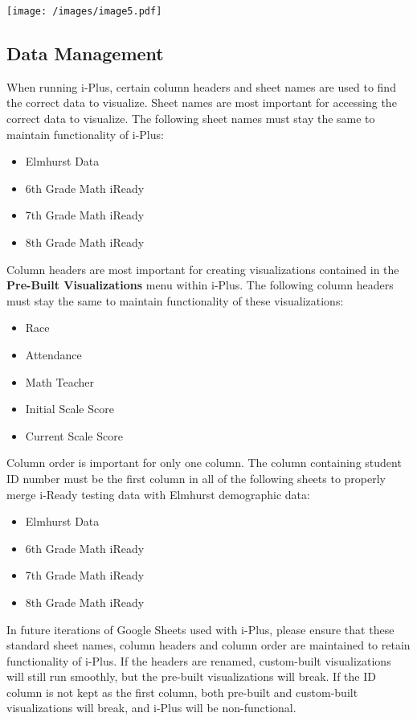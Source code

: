 \documentclass[
  letterpaper,
  DIV=11,
  numbers=noendperiod]{scrartcl}
\providecommand{\tightlist}{%
  \setlength{\itemsep}{0pt}\setlength{\parskip}{0pt}}\usepackage{longtable,booktabs,array}
\begin{document}
\texttt{[image: /images/image5.pdf]}

\subsection{Data Management}\label{data-management}

When running i-Plus, certain column headers and sheet names are used to
find the correct data to visualize. Sheet names are most important for
accessing the correct data to visualize. The following sheet names must
stay the same to maintain functionality of i-Plus:

\begin{itemize}
\tightlist
\item
  Elmhurst Data
\item
  6th Grade Math iReady
\item
  7th Grade Math iReady
\item
  8th Grade Math iReady
\end{itemize}

Column headers are most important for creating visualizations contained
in the \textbf{Pre-Built Visualizations} menu within i-Plus. The
following column headers must stay the same to maintain functionality of
these visualizations:

\begin{itemize}
\tightlist
\item
  Race
\item
  Attendance
\item
  Math Teacher
\item
  Initial Scale Score
\item
  Current Scale Score
\end{itemize}

Column order is important for only one column. The column containing
student ID number must be the first column in all of the following
sheets to properly merge i-Ready testing data with Elmhurst demographic
data:

\begin{itemize}
\tightlist
\item
  Elmhurst Data
\item
  6th Grade Math iReady
\item
  7th Grade Math iReady
\item
  8th Grade Math iReady
\end{itemize}

In future iterations of Google Sheets used with i-Plus, please ensure
that these standard sheet names, column headers and column order are
maintained to retain functionality of i-Plus. If the headers are
renamed, custom-built visualizations will still run smoothly, but the
pre-built visualizations will break. If the ID column is not kept as the
first column, both pre-built and custom-built visualizations will break,
and i-Plus will be non-functional.
\end{document}

